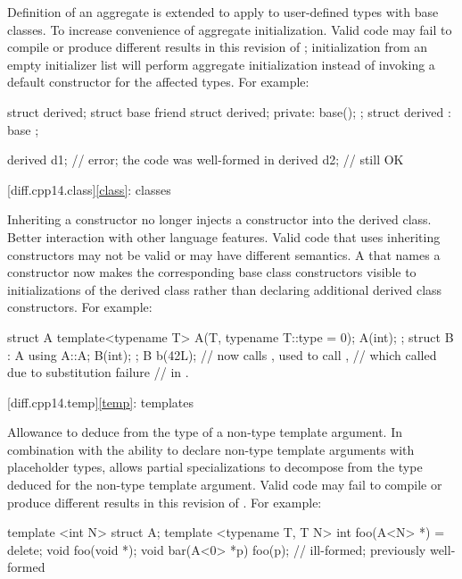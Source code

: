 \change
Definition of an aggregate is extended
to apply to user-defined types with base classes.
\rationale
To increase convenience of aggregate initialization.
\effect
Valid \CppXIV{} code may fail to compile or produce different results in this
revision of \Cpp{}; initialization from an empty initializer list will
perform aggregate initialization instead of invoking a default constructor
for the affected types.
For example:
\begin{codeblock}
struct derived;
struct base {
  friend struct derived;
private:
  base();
};
struct derived : base {};

derived d1{};       // error; the code was well-formed in \CppXIV{}
derived d2;         // still OK
\end{codeblock}

[diff.cpp14.class]{\ref{class}: classes}

\change
Inheriting a constructor no longer injects a constructor into the derived class.
\rationale
Better interaction with other language features.
\effect
Valid \CppXIV{} code that uses inheriting constructors may not be valid
or may have different semantics. A 
that names a constructor now makes the corresponding base class constructors
visible to initializations of the derived class
rather than declaring additional derived class constructors.
For example:
\begin{codeblock}
struct A {
  template<typename T> A(T, typename T::type = 0);
  A(int);
};
struct B : A {
  using A::A;
  B(int);
};
B b(42L);           // now calls , used to call ,
                    // which called  due to substitution failure
                    // in .
\end{codeblock}

[diff.cpp14.temp]{\ref{temp}: templates}

\change
Allowance to deduce from the type of a non-type template argument.
\rationale
In combination with the ability to declare
non-type template arguments with placeholder types,
allows partial specializations to decompose
from the type deduced for the non-type template argument.
\effect
Valid \CppXIV{} code may fail to compile
or produce different results in this revision of \Cpp{}.
For example:
\begin{codeblock}
template <int N> struct A;
template <typename T, T N> int foo(A<N> *) = delete;
void foo(void *);
void bar(A<0> *p) {
  foo(p);           // ill-formed; previously well-formed
}
\end{codeblock}

